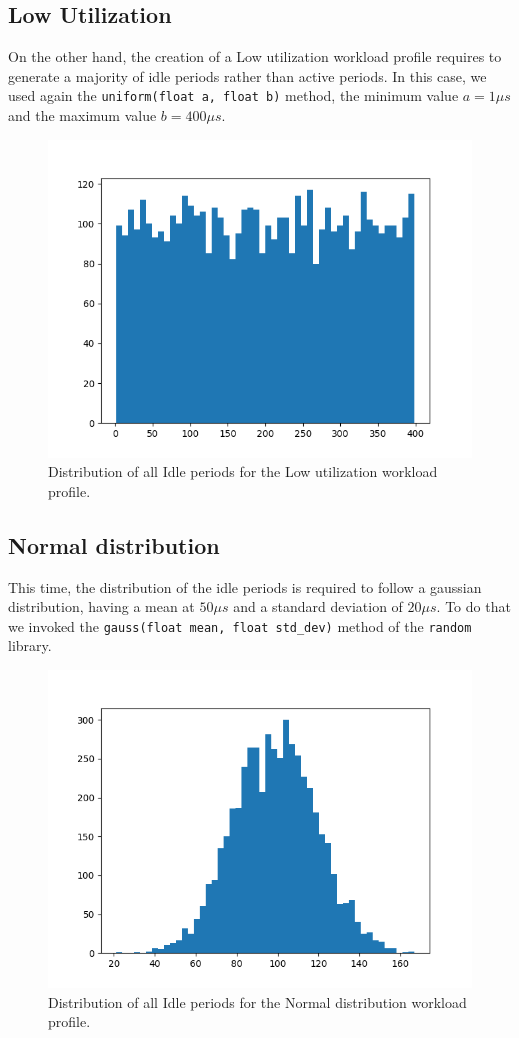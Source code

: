 \documentclass[a4paper]{article}
\begin{document}
    \subsection{Low Utilization}
        On the other hand, the creation of a Low utilization workload profile requires to generate a majority of idle periods rather than active periods. In this case, we used again the \texttt{uniform(float a, float b)} method, the minimum value $a=1\mu s$ and the maximum value $b=400 \mu s$.
        \begin{figure}[htp]
            \centering
            \includegraphics[width=0.3 \columnwidth]{./screenshots/Idle2.png}
            \caption{
                    \label{fig:Active}
                    Distribution of all Idle periods for the Low utilization workload profile.
            }
        \end{figure}
    \subsection{Normal distribution}
        This time, the distribution of the idle periods is required to follow a gaussian distribution, having a mean at $50 \mu s$ and a standard deviation of $20 \mu s$.
        To do that we invoked the \texttt{gauss(float mean, float std\_dev)} method of the \texttt{random} library.
        \begin{figure}[htp]
            \centering
            \includegraphics[width=0.3 \columnwidth]{./screenshots/Idle3.png}
            \caption{
                    \label{fig:Active}
                    Distribution of all Idle periods for the Normal distribution workload profile.
            }
        \end{figure}
\end{document}
